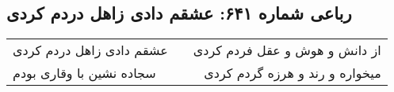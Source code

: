 \begin{center}
\section*{رباعی شماره ۶۴۱: عشقم دادی زاهل دردم کردی}
\label{sec:sh641}
\begin{longtable}{l p{0.5cm} r}
عشقم دادی زاهل دردم کردی
&&
از دانش و هوش و عقل فردم کردی
\\
سجاده نشین با وقاری بودم
&&
میخواره و رند و هرزه گردم کردی
\\
\end{longtable}
\end{center}
